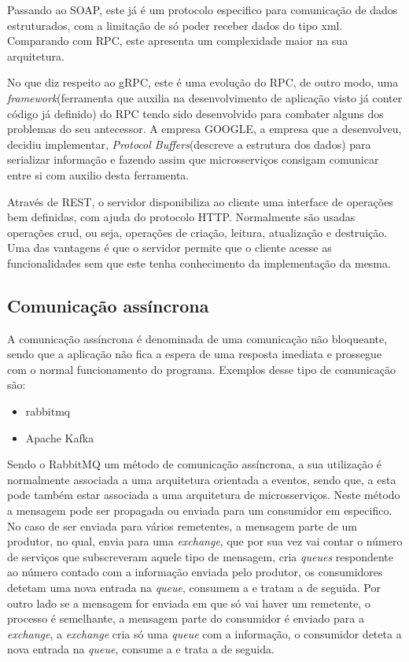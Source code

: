 Passando ao SOAP, este já é um protocolo especifico para comunicação de dados estruturados, com a limitação de só poder receber dados do tipo \ac{xml}. Comparando com RPC, este apresenta um complexidade maior na sua arquitetura.

No que diz respeito ao gRPC, este é uma evolução do RPC, de outro modo, uma \textit{framework}(ferramenta que auxilia na desenvolvimento de aplicação visto já conter código já definido) do RPC tendo sido desenvolvido para combater alguns dos problemas do seu antecessor. A empresa GOOGLE, a empresa que a desenvolveu, decidiu implementar, \textit{Protocol Buffers}(descreve a estrutura dos dados) para serializar informação e fazendo assim que microsserviços consigam comunicar entre si com auxilio desta ferramenta.

Através de REST, o servidor disponibiliza ao cliente uma interface de operações bem definidas, com ajuda do protocolo HTTP. Normalmente são usadas operações \ac{crud}, ou seja, operações de criação, leitura, atualização e destruição. Uma das vantagens é que o servidor permite que o cliente acesse as funcionalidades sem que este tenha conhecimento da implementação da mesma.


\subsection{Comunicação assíncrona}

A comunicação assíncrona é denominada de uma comunicação não bloqueante, sendo que a aplicação não fica a espera de uma resposta imediata e prossegue com o normal funcionamento do programa.
Exemplos desse tipo de comunicação são: 
\begin{itemize}
    \item \ac{rabbitmq}
    \item Apache Kafka
\end{itemize}

Sendo o RabbitMQ um método de comunicação assíncrona, a sua utilização é normalmente associada a uma arquitetura orientada a eventos, sendo que, a esta pode também estar associada a uma arquitetura de microsserviços. Neste método a mensagem pode ser propagada ou enviada para um consumidor em especifico. No caso de ser enviada para vários remetentes, a mensagem parte de um produtor, no qual, envia para uma \textit{exchange}, que por sua vez vai contar o número de serviços que subscreveram aquele tipo de mensagem, cria \textit{queues} respondente ao número contado com a informação enviada pelo produtor, os consumidores detetam uma nova entrada na \textit{queue}, consumem a e tratam a de seguida. Por outro lado se a mensagem for enviada em que só vai haver um remetente, o processo é semelhante, a mensagem parte do consumidor é enviado para a \textit{exchange}, a \textit{exchange} cria só uma \textit{queue} com a informação, o consumidor deteta a nova entrada na \textit{queue}, consume a e trata a de seguida.


